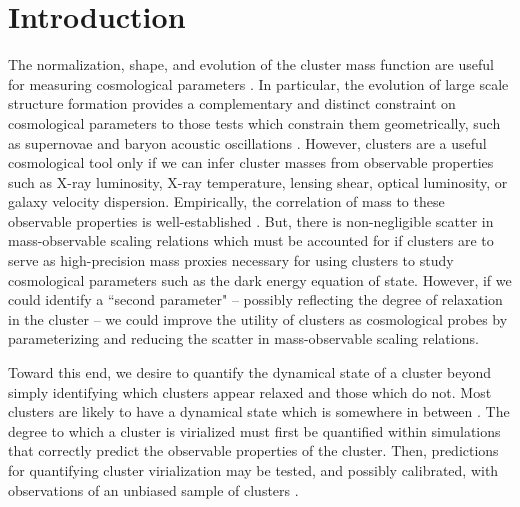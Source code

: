 \section{Introduction}
\label{sec:ebandintro}

The normalization, shape, and evolution of the cluster mass function
are useful for measuring cosmological parameters
\citep[\eg][]{1989ApJ...341L..71E, 1998ApJ...508..483W,
  2001ApJ...553..545H, 2004PhRvD..70l3008W}. In particular, the
evolution of large scale structure formation provides a complementary
and distinct constraint on cosmological parameters to those tests
which constrain them geometrically, such as supernovae
\citep{1998AJ....116.1009R, 2007ApJ...659...98R} and baryon acoustic
oscillations \citep{2005ApJ...633..560E}. However, clusters are a
useful cosmological tool only if we can infer cluster masses from
observable properties such as X-ray luminosity, X-ray temperature,
lensing shear, optical luminosity, or galaxy velocity
dispersion. Empirically, the correlation of mass to these observable
properties is well-established \citep[see][for a
  review]{voitreview}. But, there is non-negligible scatter in
mass-observable scaling relations which must be accounted for if
clusters are to serve as high-precision mass proxies necessary for
using clusters to study cosmological parameters such as the dark
energy equation of state. However, if we could identify a ``second
parameter" -- possibly reflecting the degree of relaxation in the
cluster -- we could improve the utility of clusters as cosmological
probes by parameterizing and reducing the scatter in mass-observable
scaling relations.

Toward this end, we desire to quantify the dynamical state of a
cluster beyond simply identifying which clusters appear relaxed and
those which do not. Most clusters are likely to have a dynamical state
which is somewhere in between \citep{2006ApJ...639...64O, kravtsov06,
  VV08}. The degree to which a cluster is virialized must first be
quantified within simulations that correctly predict the observable
properties of the cluster. Then, predictions for quantifying cluster
virialization may be tested, and possibly calibrated, with
observations of an unbiased sample of clusters \citep[\eg REXCESS
  sample of][]{rexcess}.

